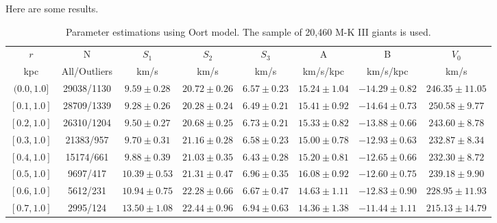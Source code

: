 \documentclass[onecolumn]{aa}   %
\begin{document}
Here are some results.
\begin{table}[ht]
\caption{\label{tab: OortMod}
Parameter estimations using Oort model.  The sample of 20,460 M-K III giants is used.}
\centering
\begin{tabular}{c c c c c c c c}
\hline
$r$   				&N    		&$S_1$ 	&$S_2$  	&$S_3$		&A      	 	& B        		&$V_0$ \\
kpc		&  All/Outliers   &km/s	&km/s 	&km/s       &km/s/kpc        & km/s/kpc  	&km/s \\
\hline
$(0.0,1.0]$		&29038/1130 &$9.59 \pm 0.28$    &$20.72 \pm 0.26$   &$6.57 \pm 0.23$    &$15.24 \pm 1.04$   &$-14.29 \pm 0.82$  &$246.35 \pm 11.05$ \\

$[0.1, 1.0]$		&28709/1339 &$9.28 \pm 0.26$    &$20.28 \pm 0.24$   &$6.49 \pm 0.21$    &$15.41 \pm 0.92$   &$-14.64 \pm 0.73$  &$250.58 \pm 9.77$ \\

$[0.2, 1.0]$		&26310/1204 &$9.50 \pm 0.27$    &$20.68 \pm 0.25$   &$6.73 \pm 0.21$    &$15.33 \pm 0.82$   &$-13.88 \pm 0.66$  &$243.60 \pm 8.78$ \\

$[0.3, 1.0]$		&21383/957  &$9.70 \pm 0.31$    &$21.16 \pm 0.28$   &$6.58 \pm 0.23$    &$15.00 \pm 0.78$   &$-12.93 \pm 0.63$  &$232.87 \pm 8.34$ \\

$[0.4, 1.0]$		&15174/661  &$9.88 \pm 0.39$    &$21.03 \pm 0.35$   &$6.43 \pm 0.28$    &$15.20 \pm 0.81$   &$-12.65 \pm 0.66$  &$232.30 \pm 8.72$ \\

$[0.5, 1.0]$		&9697/417   &$10.39 \pm 0.53$   &$21.31 \pm 0.47$   &$6.96 \pm 0.35$    &$16.08 \pm 0.92$   &$-12.60 \pm 0.75$  &$239.18 \pm 9.90$ \\

$[0.6, 1.0]$		&5612/231   &$10.94 \pm 0.75$   &$22.28 \pm 0.66$   &$6.67 \pm 0.47$    &$14.63 \pm 1.11$   &$-12.83 \pm 0.90$  &$228.95 \pm 11.93$ \\

$[0.7, 1.0]$		&2995/124   &$13.50 \pm 1.08$   &$22.44 \pm 0.96$   &$6.94 \pm 0.63$    &$14.36 \pm 1.38$   &$-11.44 \pm 1.11$  &$215.13 \pm 14.79$  \\
\hline
\end{tabular}
\end{table}
\end{document}
